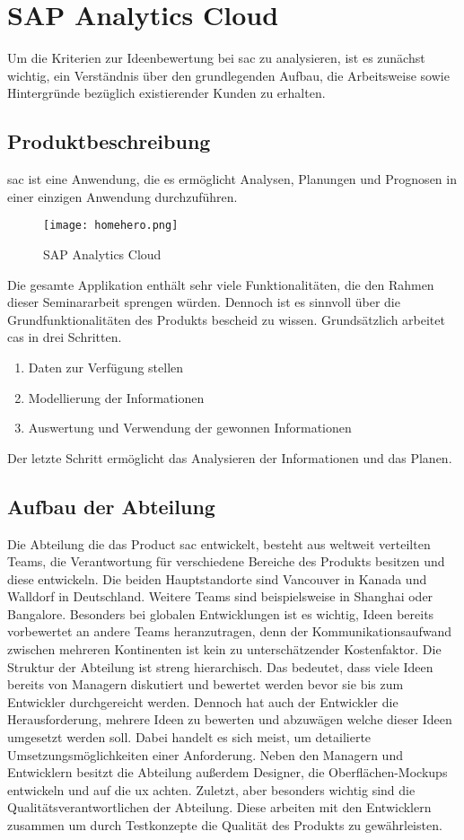 \newpage
\section{SAP Analytics Cloud}\label{sec:sac}
Um die Kriterien zur Ideenbewertung bei \ac{sac} zu analysieren, ist es zunächst 
wichtig, ein Verständnis über den grundlegenden Aufbau, die Arbeitsweise sowie Hintergründe bezüglich 
existierender Kunden zu erhalten. 

\subsection{Produktbeschreibung}
\ac{sac} ist eine Anwendung, die es ermöglicht Analysen, Planungen und Prognosen in einer einzigen Anwendung durchzuführen. 
\begin{figure}[ht]
	\centering
	\texttt{[image: homehero.png]}
	\caption{SAP Analytics Cloud}
	\label{img:homeHeroSAC}
\end{figure}
Die gesamte Applikation enthält sehr viele Funktionalitäten, die den Rahmen dieser Seminararbeit sprengen würden. Dennoch ist
es sinnvoll über die Grundfunktionalitäten des Produkts bescheid zu wissen. 
Grundsätzlich arbeitet \ac{cas} in drei Schritten. 

\begin{enumerate}
    \item Daten zur Verfügung stellen
    \item Modellierung der Informationen
    \item Auswertung und Verwendung der gewonnen Informationen 
\end{enumerate}
Der letzte Schritt ermöglicht das Analysieren der Informationen und das Planen. 

\subsection{Aufbau der Abteilung}
Die Abteilung die das Product \ac{sac} entwickelt, besteht aus weltweit verteilten Teams, 
die Verantwortung für verschiedene Bereiche des Produkts besitzen und diese entwickeln. 
Die beiden Hauptstandorte sind Vancouver in Kanada und Walldorf in Deutschland. Weitere Teams sind beispielsweise in 
Shanghai oder Bangalore. Besonders bei globalen Entwicklungen ist es wichtig, Ideen bereits vorbewertet an andere Teams 
heranzutragen, denn der Kommunikationsaufwand zwischen mehreren Kontinenten ist kein zu unterschätzender Kostenfaktor. 
Die Struktur der Abteilung ist streng hierarchisch. Das bedeutet, dass viele Ideen bereits von Managern diskutiert und 
bewertet werden bevor sie bis zum Entwickler durchgereicht werden. Dennoch hat auch der Entwickler die Herausforderung, 
mehrere Ideen zu bewerten und abzuwägen welche dieser Ideen umgesetzt werden soll. Dabei handelt es sich meist, um detailierte Umsetzungsmöglichkeiten
einer Anforderung. 
Neben den Managern und Entwicklern besitzt die Abteilung außerdem Designer, die Oberflächen-Mockups entwickeln und auf
die \ac{ux} achten. Zuletzt, aber besonders wichtig sind die Qualitätsverantwortlichen der Abteilung. Diese 
arbeiten mit den Entwicklern zusammen um durch Testkonzepte die Qualität des Produkts zu gewährleisten.

